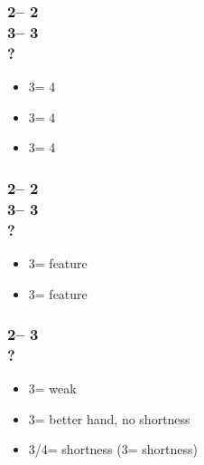 \documentclass[12pt, a4paper]{article}
\begin{document}
{    \subsubsection*{2\hearts -- 2\nt\\
                    3\clubs -- 3\diams\\
                    ?}
    \begin{itemize}
        \item 3\hearts = 4\spades
        \item 3\spades = 4\clubs
        \item 3\nt = 4\diams
    \end{itemize}

    \subsubsection*{2\hearts -- 2\nt\\
                    3\diams -- 3\hearts\\
                    ?}
    \begin{itemize}
        \item 3\spades = \clubs feature
        \item 3\nt = \diams feature
    \end{itemize}

    \subsubsection*{2\hearts -- 3\diams\\
                    ?}
    \begin{itemize}
        \item 3\hearts = weak
        \item 3\spades = better hand, no shortness
        \item 3\nt/4\minor = shortness (3\nt = \spades shortness)
    \end{itemize}
}

\newpage
\end{document}
